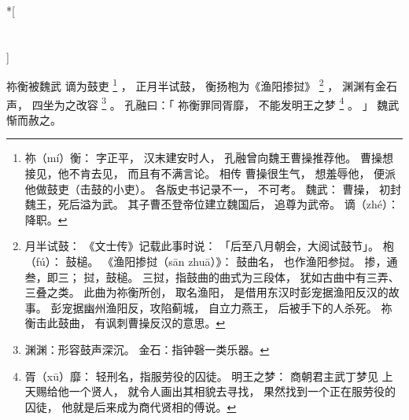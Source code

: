 
\switchcolumn[0]*[\section{}]

祢衡被魏武
谪为鼓吏%
\footnote{%
    祢（mí）衡：
        字正平，
        汉末建安时人，
        孔融曾向魏王曹操推荐他。
        曹操想接见，他不肯去见，
        而且有不满言论。
        相传
        曹操很生气，
        想羞辱他，
        便派他做鼓吏（击鼓的小吏）。
        各版史书记录不一，
        不可考。
    魏武：
        曹操，
        初封魏王，死后溢为武。
        其子曹丕登帝位建立魏国后，
        追尊为武帝。
    谪（zhé）：降职。
}%
，
正月半试鼓，
衡扬枹为《渔阳掺挝》%
\footnote{%
    月半试鼓：
        《文士传》记载此事时说：
        「后至八月朝会，大阅试鼓节」。
    枹（fú）：
        鼓槌。
    《渔阳掺挝（sān zhuā）》：
        鼓曲名，
        也作渔阳参挝。
        掺，通叁，即三；
        挝，鼓槌。
        三挝，指鼓曲的曲式为三段体，
        犹如古曲中有三弄、三叠之类。
        此曲为祢衡所创，
        取名渔阳，
        是借用东汉时彭宠据渔阳反汉的故事。
        彭宠据幽州渔阳反，攻陷蓟城，
        自立力燕王，
        后被手下的人杀死。
        祢衡击此鼓曲，
        有讽刺曹操反汉的意思。
}%
，
渊渊有金石声，
四坐为之改容%
\footnote{%
    渊渊：形容鼓声深沉。
    金石：指钟磬一类乐器。
}%
。
孔融曰：「
    祢衡罪同胥靡，
    不能发明王之梦%
    \footnote{%
        胥（xū）靡：
            轻刑名，指服劳役的囚徒。
        明王之梦：
            商朝君主武丁梦见
            上天赐给他一个贤人，
            就令人画出其相貌去寻找，
            果然找到一个正在服劳役的囚徒，
            他就是后来成为商代贤相的傅说。
    }%
    。
」
魏武惭而赦之。

\switchcolumn



